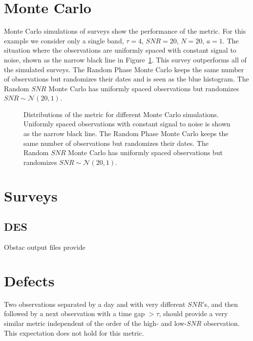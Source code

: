 \documentclass[preprint]{aastex}
\newcommand\SNR{\mathit{SNR}}
\begin{document}
\section{Monte Carlo}
Monte Carlo simulations of surveys show the performance of the metric.  For this example we consider only a single band, $\tau=4$, $\SNR=20$, $N=20$, $a=1$.
The situation where the observations are uniformly spaced with constant signal to noise, shown as the narrow black line in
Figure~\ref{mc:fig}.  This survey outperforms all of the simulated surveys.
The Random Phase Monte Carlo keeps the same number of observations but randomizes their dates and is seen as the blue histogram.
The Random $\SNR$ Monte Carlo has uniformly spaced observations but randomizes $\SNR \sim \mathcal{N}(20,1)$. 
\begin{figure}[htbp] %
   \centering
   \caption{Distributions of the metric for different Monte Carlo simulations.  Uniformly spaced observations with constant signal to noise is shown as the narrow black line.
   The Random Phase Monte Carlo 
   keeps the same number of observations but randomizes their dates.  The Random $\SNR$ Monte Carlo has uniformly spaced observations but randomizes $\SNR \sim \mathcal{N}(20,1)$.  }
   \label{mc:fig}
\end{figure}

\section{Surveys}
\subsection{DES}
Obstac output files provide 

\section{Defects}
Two observations separated by a day and with very different $\SNR$'s, and then followed by a next observation with a time gap $>\tau$, should provide a very similar metric independent
of the order of the high- and low-$\SNR$ observation.  This expectation does not hold for this metric.
\end{document}
